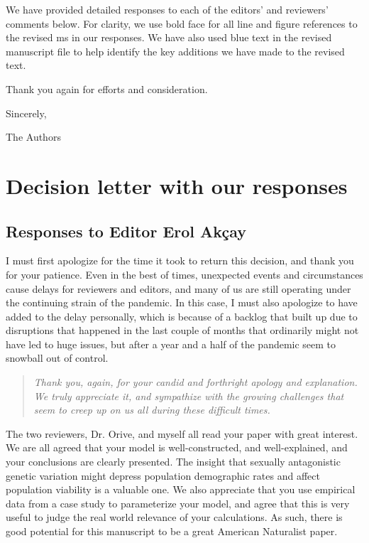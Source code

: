 \documentclass[11pt]{article}
\begin{document}
\noindent We have provided detailed responses to each of the editors' and reviewers' comments below. For clarity, we use bold face for all line and figure references to the revised ms in our responses. We have also used blue text in the revised manuscript file to help identify the key additions we have made to the revised text.
\bigskip

\noindent Thank you again for efforts and consideration.
\bigskip

\noindent Sincerely,

\noindent The Authors \\
\noindent\makebox[\linewidth]{\rule{\textwidth}{0.4pt}}
\smallskip


\section*{Decision letter with our responses}

\subsection*{Responses to Editor Erol Ak\c{c}ay}


I must first apologize for the time it took to return this decision, and thank you for your patience. Even in the best of times, unexpected events and circumstances cause delays for reviewers and editors, and many of us are still operating under the continuing strain of the pandemic. In this case, I must also apologize to have added to the delay personally, which is because of a backlog that built up due to disruptions that happened in the last couple of months that ordinarily might not have led to huge issues, but after a year and a half of the pandemic seem to snowball out of control.

\begin{quote}
	{\itshape Thank you, again, for your candid and forthright apology and explanation. We truly appreciate it, and sympathize with the growing challenges that seem to creep up on us all during these difficult times.}
\end{quote}


The two reviewers, Dr. Orive, and myself all read your paper with great interest. We are all agreed that your model is well-constructed, and well-explained, and your conclusions are clearly presented. The insight that sexually antagonistic genetic variation might depress population demographic rates and affect population viability is a valuable one. We also appreciate that you use empirical data from a case study to parameterize your model, and agree that this is very useful to judge the real world relevance of your calculations. As such, there is good potential for this manuscript to be a great American Naturalist paper.
\end{document}
